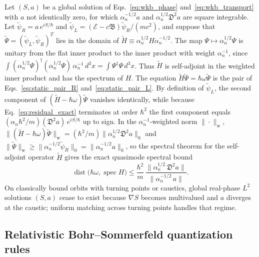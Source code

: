 \documentclass[aps,prd,onecolumn,tightenlines,nofootinbib,notitlepage,11pt,floatfix]{revtex4-2}
\theoremstyle{indentedtheorem}
\begin{document}
Let $(S,a)$ be a global solution of Eqs.~\eqref{eq:wkb_phase} and~\eqref{eq:wkb_transport} with $a$ not identically zero, for which $\alpha_n^{-1/2}a$ and $\alpha_n^{1/2}\mathfrak{D}^2a$ are square integrable. Let $\tilde{\psi}_R = a\,e^{iS/\hbar}$ and $\tilde{\psi}_L = (\mathcal{E}-c\mathfrak{B})\tilde{\psi}_R/(mc^2)$, and suppose that $\tilde{\Psi}=(\tilde{\psi}_L,\tilde{\psi}_R)^T$ lies in the domain of $\tilde{H} \equiv \alpha_n^{1/2}H\alpha_n^{-1/2}$. The map $\Psi\mapsto\alpha_n^{1/2}\Psi$ is unitary from the flat inner product to the inner product with weight $\alpha_n^{-1}$, since $\int(\alpha_n^{1/2}\Psi)^\dagger(\alpha_n^{1/2}\Psi)\,\alpha_n^{-1}\,d^3x=\int\Psi^\dagger\Psi\,d^3x$. Thus $\tilde{H}$ is self-adjoint in the weighted inner product and has the spectrum of $H$. The equation $\tilde{H}\tilde{\Psi}=\hbar\omega\tilde{\Psi}$ is the pair of Eqs.~\eqref{eq:static_pair_R} and~\eqref{eq:static_pair_L}. By definition of $\tilde{\psi}_L$, the second component of $(\tilde{H}-\hbar\omega)\tilde{\Psi}$ vanishes identically, while because Eq.~\eqref{eq:residual_exact} terminates at order $\hbar^2$ the first component equals $(\alpha_n\hbar^2/m)(\mathfrak{D}^2a)\,e^{iS/\hbar}$ up to sign. In the $\alpha_n^{-1}$-weighted norm $\|\cdot\|_\text{w}$, $\|(\tilde{H}-\hbar\omega)\tilde{\Psi}\|_\text{w} = (\hbar^2/m)\|\alpha_n^{1/2}\mathfrak{D}^2a\|_0$ and $\|\tilde{\Psi}\|_\text{w} \ge \|\alpha_n^{-1/2}\tilde{\psi}_R\|_0 = \|\alpha_n^{-1/2}a\|_0$, so the spectral theorem for the self-adjoint operator $\tilde{H}$ gives the exact quasimode spectral bound
\begin{equation}
    \operatorname{dist}\big(\hbar\omega,\operatorname{spec}H\big) \leq \frac{\hbar^2}{m}\,\frac{\big\|\alpha_n^{1/2}\,\mathfrak{D}^2a\big\|}{\big\|\alpha_n^{-1/2}\,a\big\|} .
    \label{eq:quasimode}
\end{equation}
On classically bound orbits with turning points or caustics, global real-phase $L^2$ solutions $(S,a)$ cease to exist because $\nabla S$ becomes multivalued and $a$ diverges at the caustic; uniform matching across turning points handles that regime.

\subsection{Relativistic Bohr--Sommerfeld quantization rules}
\label{sec:bs_theorems}
\end{document}
